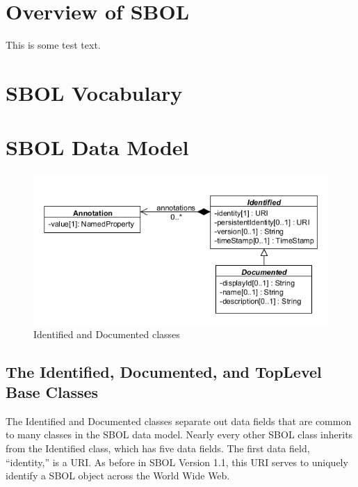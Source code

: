 \documentclass[draftspec]{sbmlpkgspec}
\begin{document}
\section{Overview of SBOL}
This is some test text. 

\section{SBOL Vocabulary}

\section{SBOL Data Model}

\begin{figure}[h]
\begin{center}
\includegraphics[width=\textwidth]{uml/identified_documented_annotation}
\caption[]{Identified and Documented classes}
\label{uml:identified_documented_annotation}
\end{center}
\end{figure}


\subsection{The Identified, Documented, and TopLevel Base Classes}

The Identified and Documented classes separate out data fields that are common to many classes in the SBOL data model. Nearly every other SBOL class inherits from the Identified class, which has five data fields. The first data field, “identity,” is a URI. As before in SBOL Version 1.1, this URI serves to uniquely identify a SBOL object across the World Wide Web. 
\end{document}
